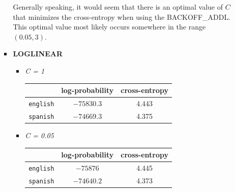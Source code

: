 \documentclass[11pt]{article}
\begin{document}
\begin{enumerate}
\begin{enumerate}[label=(\alph*)]
\begin{itemize}
\begin{itemize}
\begin{center}
\begin{tabular}{| r || c | c |}
				\end{tabular}\end{center} \vspace{8pt}

			\end{itemize} \vspace{8pt}

			Generally speaking, it would seem that there is an optimal value of $C$ that minimizes the cross-entropy when using the BACKOFF\_ADDL. This optimal value most likely occurs somewhere in the range $(0.05, 3)$.
			\vspace{8pt} \\

		\newpage
		\item[] \hspace{-24pt} \textbf{LOGLINEAR}

			\begin{itemize}
			\item[] \hspace{-24pt} \textit{C = 1} 	 \vspace{4pt}
				\begin{center}\begin{tabular}{| r || c | c |}
				\hline
									& log-probability	& cross-entropy \\
				\hline \hline
				\texttt{english}	& $-75830.3$		& 4.443			\\
				\texttt{spanish}	& $-74669.3$		& 4.375			\\
				\hline
				
				\end{tabular}\end{center}
				
			\item[] \hspace{-24pt} \textit{C = 0.05} \vspace{4pt}
				\begin{center}\begin{tabular}{| r || c | c |}
				\hline
									& log-probability	& cross-entropy \\
				\hline \hline
				\texttt{english}	& $-75876$			& 4.445			\\
				\texttt{spanish}	& $-74640.2$		& 4.373			\\
				\hline
				
				\end{tabular}\end{center}


\end{itemize}
\end{itemize}
\end{enumerate}
\end{enumerate}
\end{document}
